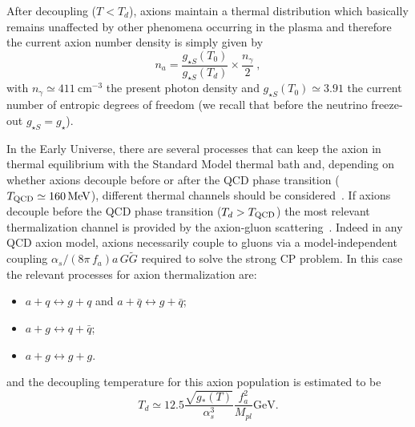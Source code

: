 \documentclass[fleqn,usenatbib,letters]{mnras}
\begin{document}
After decoupling ($T<T_d$), axions maintain a thermal distribution which basically remains unaffected by other phenomena occurring in the plasma and therefore the current axion number density is simply given by
\begin{equation}
n_{a}=\frac{g_{\star S}\left(T_{0}\right)}{g_{\star S}\left(T_{d}\right)} \times \frac{n_{\gamma}}{2}~,
\label{na}
\end{equation}
with $n_{\gamma}\simeq 411 \mathrm{~cm}^{-3}$ the present photon density and $g_{\star S}(T_0)\simeq 3.91$ the current number of entropic degrees of freedom (we recall that  before the neutrino freeze-out $g_{\star S}=g_{\star}$).

In the Early Universe, there are several processes that can keep the axion in thermal equilibrium with the Standard Model thermal bath and, depending on whether axions decouple before or after the QCD phase transition ($T_{\rm QCD}\simeq 160\,\rm{MeV}$), different thermal channels should be considered~\citep{Ferreira:2018vjj,DEramo:2021usm,DEramo:2021lgb,DEramo:2021psx,Arias-Aragon:2020shv,DEramo:2018vss,Ferreira:2020bpb}.  If axions decouple before the QCD phase transition ($T_d>T_{\rm QCD}$) the most relevant thermalization channel is provided by the axion-gluon scattering~\citep{Melchiorri:2007cd,Hannestad:2007dd,Hannestad:2008js,Hannestad:2010yi,Archidiacono:2013cha,Giusarma:2014zza,DiValentino:2015zta,DiValentino:2015wba,Archidiacono:2015mda,Hannestad:2005df}. Indeed in any QCD axion model, axions necessarily couple to gluons via a model-independent coupling $\alpha_s/(8\pi\,f_a) a\,G\tilde G$ required to solve the strong CP problem. In this case the relevant processes for axion thermalization are:
\begin{itemize}
\item $a + q \leftrightarrow g  + q$ and  $a  + \bar{q} \leftrightarrow g + \bar{q}$;
\item $a + g \leftrightarrow q + \bar{q}$;
\item $a + g \leftrightarrow g + g$. 
\end{itemize}
and the decoupling temperature for this axion population is estimated to be~\citep{DiLuzio:2020wdo} 
\begin{equation}
T_{d} \simeq 12.5 \frac{\sqrt{g_{*}(T)}}{\alpha_{s}^{3}} \frac{f_{a}^{2}}{M_{pl}} \mathrm{GeV}.
\label{Td_fa}
\end{equation}
\end{document}
